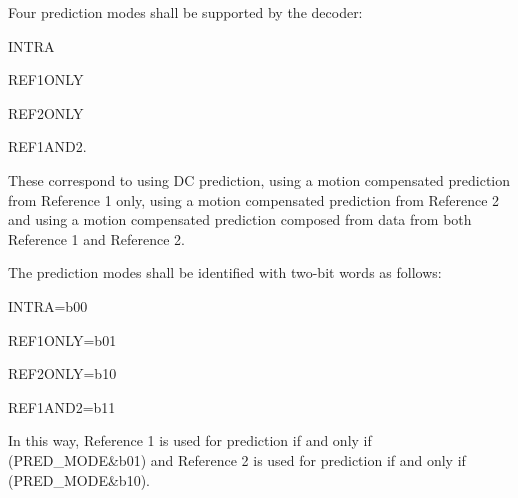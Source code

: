 Four prediction modes shall be supported by the decoder:

INTRA

REF1ONLY

REF2ONLY

REF1AND2.

These correspond to using DC prediction, using a motion compensated
prediction from Reference 1 only, using a motion compensated prediction
from Reference 2 and using a motion compensated prediction composed from
data from both Reference 1 and Reference 2.

The prediction modes shall be identified with two-bit words as follows: 

INTRA=b00

REF1ONLY=b01

REF2ONLY=b10

REF1AND2=b11

In this way, Reference 1 is used for prediction if and only if
(PRED\_MODE\&b01) and  Reference 2 is used for prediction if and only if
(PRED\_MODE\&b10).  


